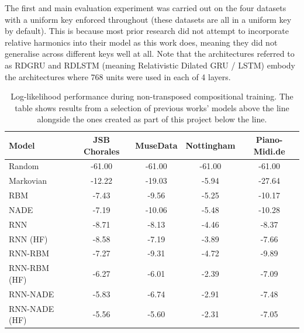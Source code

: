 \documentclass[12pt,]{article}
\begin{document}
The first and main evaluation experiment was carried out on the four
datasets with a uniform key enforced throughout (these datasets are all
in a uniform key by default). This is because most prior research did
not attempt to incorporate relative harmonics into their model as this
work does, meaning they did not generalise across different keys well at
all. Note that the architectures referred to as RDGRU and RDLSTM
(meaning Relativistic Dilated GRU / LSTM) embody the architectures where
768 units were used in each of 4 layers.

\begin{table}[H]
\centering
\caption{Log-likelihood performance during non-transposed compositional training. The table shows results from a selection of previous works’ models above the line alongside the ones created as part of this project below the line.}
\vspace{1em}
\begin{tabular}{lcccc} 
\toprule
\textbf{Model}    & \textbf{JSB Chorales} & \textbf{MuseData} & \textbf{Nottingham} & \textbf{Piano-Midi.de}  \\ 
\midrule
Random            & -61.00                & -61.00            & -61.00              & -61.00                  \\
Markovian         & -12.22                & -19.03            & -5.94               & -27.64                  \\
RBM               & -7.43                 & -9.56             & -5.25               & -10.17                  \\
NADE              & -7.19                 & -10.06            & -5.48               & -10.28                  \\
RNN               & -8.71                 & -8.13             & -4.46               & -8.37                   \\
RNN (HF)          & -8.58                 & -7.19             & -3.89               & -7.66                   \\
RNN-RBM           & -7.27                 & -9.31             & -4.72               & -9.89                   \\
RNN-RBM (HF)      & -6.27                 & -6.01             & -2.39               & -7.09                   \\
RNN-NADE          & -5.83                 & -6.74             & -2.91               & -7.48                   \\
RNN-NADE (HF)     & -5.56                 & -5.60             & -2.31               & -7.05                   \\

\end{tabular}
\end{table}
\end{document}
